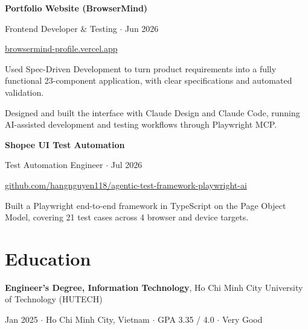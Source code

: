 \documentclass[11pt,a4paper]{article}
\newcommand{\cvsection}[1]{\section*{#1}}
\newcommand{\cvitem}[2]{%
  \vspace{0.3em}%
  #1\par
  {\small\color{muted}#2}\par
}
\newcommand{\cvlinks}[1]{{\small\color{muted}#1}\par\vspace{0.1em}}
\begin{document}
\cvitem{\textbf{Portfolio Website (BrowserMind)}}{Frontend Developer \& Testing $\cdot$ Jun 2026}
\cvlinks{\href{https://browsermind-profile.vercel.app}{browsermind-profile.vercel.app}}
\begin{cvbullets}
  \item Used Spec-Driven Development to turn product requirements into a fully functional 23-component application, with clear specifications and automated validation.
  \item Designed and built the interface with Claude Design and Claude Code, running AI-assisted development and testing workflows through Playwright MCP.
\end{cvbullets}
\cvitem{\textbf{Shopee UI Test Automation}}{Test Automation Engineer $\cdot$ Jul 2026}
\cvlinks{\href{https://github.com/hangnguyen118/agentic-test-framework-playwright-ai}{github.com/hangnguyen118/agentic-test-framework-playwright-ai}}
\begin{cvbullets}
  \item Built a Playwright end-to-end framework in TypeScript on the Page Object Model, covering 21 test cases across 4 browser and device targets.
\end{cvbullets}
\cvsection{Education}
\cvitem{\textbf{Engineer's Degree, Information Technology}, Ho Chi Minh City University of Technology (HUTECH)}{Jan 2025 $\cdot$ Ho Chi Minh City, Vietnam $\cdot$ GPA 3.35 / 4.0 $\cdot$ Very Good}
\end{document}
